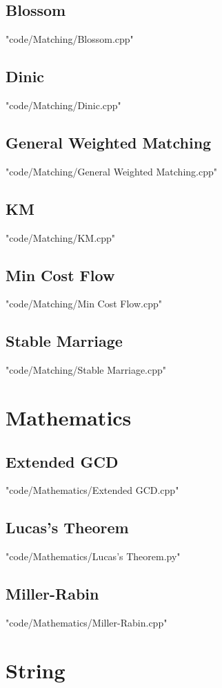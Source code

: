 \documentclass [landscape,8pt,a4paper,twocolumn]{article}
\begin{document}
\subsection{Blossom}
 {"code/Matching/Blossom.cpp"}
\subsection{Dinic}
 {"code/Matching/Dinic.cpp"}
\subsection{General Weighted Matching}
 {"code/Matching/General Weighted Matching.cpp"}
\subsection{KM}
 {"code/Matching/KM.cpp"}
\subsection{Min Cost Flow}
 {"code/Matching/Min Cost Flow.cpp"}
\subsection{Stable Marriage}
 {"code/Matching/Stable Marriage.cpp"}
\section{Mathematics}
\subsection{Extended GCD}
 {"code/Mathematics/Extended GCD.cpp"}
\subsection{Lucas's Theorem}
 {"code/Mathematics/Lucas's Theorem.py"}
\subsection{Miller-Rabin}
 {"code/Mathematics/Miller-Rabin.cpp"}
\section{String}
\end{document}
